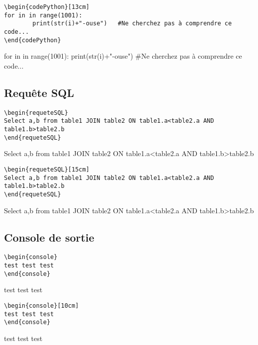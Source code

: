 \documentclass[a4paper,10pt]{article}
\begin{document}
			\begin{verbatim}
\begin{codePython}[13cm]
for in in range(1001):
        print(str(i)+"-ouse")	#Ne cherchez pas à comprendre ce code...
\end{codePython}
			\end{verbatim}
			
\begin{codePython}[13cm]
for in in range(1001):
	print(str(i)+"-ouse")	#Ne cherchez pas à comprendre ce code...
\end{codePython}


			

		\subsection{Requête SQL}

			\begin{verbatim}
\begin{requeteSQL}
Select a,b from table1 JOIN table2 ON table1.a<table2.a AND table1.b>table2.b
\end{requeteSQL}
			\end{verbatim}
			
\begin{requeteSQL}
Select a,b from table1 JOIN table2 ON table1.a<table2.a AND table1.b>table2.b
\end{requeteSQL}
		
			\begin{verbatim}
\begin{requeteSQL}[15cm]
Select a,b from table1 JOIN table2 ON table1.a<table2.a AND table1.b>table2.b
\end{requeteSQL}
			\end{verbatim}
			
\begin{requeteSQL}[15cm]
Select a,b from table1 JOIN table2 ON table1.a<table2.a AND table1.b>table2.b
\end{requeteSQL}


		\subsection{Console de sortie}

			\begin{verbatim}
\begin{console}
test test test
\end{console}
			\end{verbatim}
			
\begin{console}
test test test
\end{console}
		
			\begin{verbatim}
\begin{console}[10cm]
test test test
\end{console}
			\end{verbatim}
			
\begin{console}[10cm]
test test test
\end{console}
\end{document}

